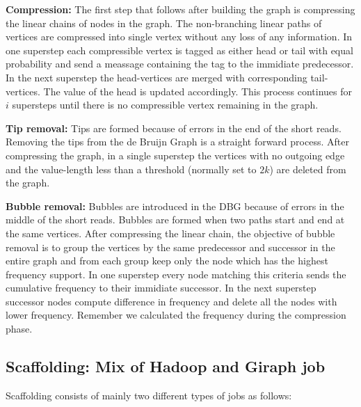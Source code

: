 \documentclass[conference]{IEEEtran}
\begin{document}
\textbf{Compression:} The first step that follows after building the graph is compressing the linear chains of nodes in the graph.
The non-branching linear paths of vertices are compressed into single vertex without any loss of any information.
In one superstep each compressible vertex is tagged as either head or tail with equal probability and send a meassage containing the tag to the immidiate predecessor.
In the next superstep the head-vertices are merged with corresponding tail-vertices.
The value of the head is updated accordingly. 
This process continues for $i$ supersteps until there is no compressible vertex remaining in the graph.

\textbf{Tip removal:} Tips are formed because of errors in the end of the short reads.
Removing the tips from the de Bruijn Graph is a straight forward process.
After compressing the graph, in a single superstep the vertices with no outgoing edge and the value-length less than a threshold (normally set to $2k$) are deleted from the graph.

\textbf{Bubble removal:} Bubbles are introduced in the DBG because of errors in the middle of the short reads.
Bubbles are formed when two paths start and end at the same vertices.
After compressing the linear chain, the objective of bubble removal is to group the vertices by the same predecessor and successor in the entire graph and from each group keep only the node which has the highest frequency support.
In one superstep every node matching this criteria sends the cumulative frequency to their immidiate successor.
In the next superstep successor nodes compute difference in frequency and delete all the nodes with lower frequency.
Remember we calculated the frequency during the compression phase.

\subsection {Scaffolding: Mix of Hadoop and Giraph job}
Scaffolding consists of mainly two different types of jobs as follows:
\end{document}
